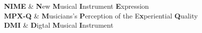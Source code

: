 \documentclass[a4paper, 11pt, oneside]{Thesis}  %
\begin{document}
\pagestyle{fancy}  %


\tableofcontents  %

\listoffigures  %

\listoftables  %

\clearpage  %
{
\textbf{NIME} & \textbf{N}ew \textbf{M}usical \textbf{I}nstrument \textbf{E}xpression \\

\textbf{MPX-Q} & \textbf{M}usicians's \textbf{P}erception of the E\textbf{x}periential \textbf{Q}uality\\

\textbf{DMI} & \textbf{D}igtal \textbf{M}usical \textbf{I}nstrument \\
}

%
\end{document}
